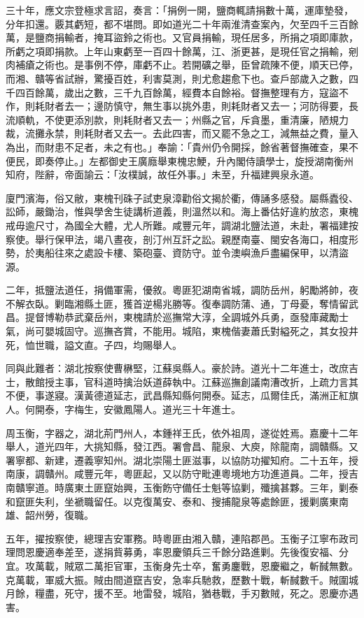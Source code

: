\begin{pinyinscope}
三十年，應文宗登極求言詔，奏言：「捐例一開，鹽商輒請捐數十萬，運庫墊發，分年扣還。覈其虧短，都不堪問。即如道光二十年兩淮清查案內，欠至四千三百餘萬，是鹽商捐輸者，掩耳盜鈴之術也。又官員捐輸，現任居多，所捐之項即庫款，所虧之項即捐款。上年山東虧至一百四十餘萬，江、浙更甚，是現任官之捐輸，剜肉補瘡之術也。是事例不停，庫虧不止。若開礦之舉，臣曾疏陳不便，順天已停，而湘、贛等省試辦，驚擾百姓，利害莫測，則尤愈趨愈下也。查戶部歲入之數，四千四百餘萬，歲出之數，三千九百餘萬，經費本自餘裕。督撫整理有方，寇盜不作，則耗財者去一；邊防慎守，無生事以挑外患，則耗財者又去一；河防得要，長流順軌，不使更添別款，則耗財者又去一；州縣之官，斥貪墨，重清廉，陋規力裁，流攤永禁，則耗財者又去一。去此四害，而又罷不急之工，減無益之費，量入為出，而財患不足者，未之有也。」奉諭：「貴州仍令開採，餘省著督撫確查，果不便民，即奏停止。」左都御史王廣廕舉東槐忠鯁，升內閣侍讀學士，旋授湖南衡州知府，陛辭，帝面諭云：「汝樸誠，故任外事。」未至，升福建興泉永道。

廈門濱海，俗又敝，東槐刊硃子試吏泉漳勸俗文揭於衢，傳誦多感發。屬縣蠹役、訟師，嚴鋤治，惟與學舍生徒講析道義，則溫然以和。海上番估好違約放恣，東槐戒毋逾尺寸，為國全大體，尤人所難。咸豐元年，調湖北鹽法道，未赴，署福建按察使。舉行保甲法，竭八晝夜，剖汀州互訐之訟。親歷南臺、閩安各海口，相度形勢，於夷船往來之處設卡樓、築砲臺、資防守。並令澳嶼漁戶盡編保甲，以清盜源。

二年，抵鹽法道任，捐備軍需，優敘。粵匪犯湖南省城，調防岳州，躬勵將帥，夜不解衣臥。剿臨湘縣土匪，獲首逆楊兆勝等。復奉調防蒲、通，丁母憂，奪情留武昌。提督博勒恭武棄岳州，東槐請於巡撫常大淳，全調城外兵勇，亟發庫藏勵士氣，尚可嬰城固守。巡撫吝賞，不能用。城陷，東槐偕妻蕭氏對縊死之，其女投井死，恤世職，謚文直。子四，均賜舉人。

同與此難者：湖北按察使曹楙堅，江蘇吳縣人。豪於詩。道光十二年進士，改庶吉士，散館授主事，官科道時擒治妖道薛執中。江蘇巡撫創議南漕改折，上疏力言其不便，事遂寢。漢黃德道延志，武昌縣知縣何開泰。延志，瓜爾佳氏，滿洲正紅旗人。何開泰，字梅生，安徽鳳陽人。道光三十年進士。

周玉衡，字器之，湖北荊門州人，本鍾祥王氏，依外祖周，遂從姓焉。嘉慶十二年舉人，道光四年，大挑知縣，發江西。署會昌、龍泉、大庾，除龍南，調贛縣。又署寧都、新建，遷義寧知州。湖北崇陽土匪滋事，以協防功擢知府。二十五年，授南康，調贛州。咸豐元年，粵匪起，又以防守毗連粵境地方功進道員。二年，授吉南贛寧道。時廣東土匪竄始興，玉衡飭守備任士魁等協剿，殲擒甚夥。三年，剿泰和竄匪失利，坐褫職留任。以克復萬安、泰和、搜捕龍泉等處餘匪，援剿廣東南雄、韶州勞，復職。

五年，擢按察使，總理吉安軍務。時粵匪由湘入贛，連陷郡邑。玉衡子江寧布政司理問恩慶適奉差至，遂捐貲募勇，率恩慶領兵三千餘分路進剿。先後復安福、分宜。攻萬載，賊眾二萬拒官軍，玉衡身先士卒，奮勇鏖戰，恩慶繼之，斬馘無數。克萬載，軍威大振。賊由間道竄吉安，急率兵馳救，歷數十戰，斬馘數千。賊圍城月餘，糧盡，死守，援不至。地雷發，城陷，猶巷戰，手刃數賊，死之。恩慶亦遇害。


\end{pinyinscope}

